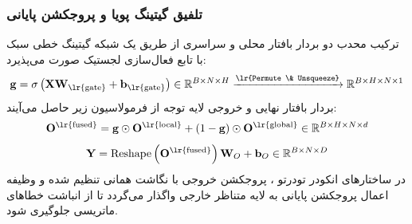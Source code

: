 \subsubsection*{تلفیق گیتینگ پویا و پروجکشن پایانی}
ترکیب محدب دو بردار بافتار محلی و سراسری از طریق یک شبکه گیتینگ خطی سبک با تابع فعال‌سازی لجستیک صورت می‌پذیرد:
\begin{equation}
\mathbf{g} = \sigma\left( \mathbf{X} \mathbf{W}_{\text{\lr{gate}}} + \mathbf{b}_{\text{\lr{gate}}} \right) \in \mathbb{R}^{B \times N \times H} \xrightarrow{\text{\lr{Permute \& Unsqueeze}}} \mathbb{R}^{B \times H \times N \times 1}
\end{equation}
بردار بافتار نهایی و خروجی لایه توجه از فرمولاسیون زیر حاصل می‌آیند:
\begin{equation}
\mathbf{O}^{\text{\lr{fused}}} = \mathbf{g} \odot \mathbf{O}^{\text{\lr{local}}} + (1 - \mathbf{g}) \odot \mathbf{O}^{\text{\lr{global}}} \in \mathbb{R}^{B \times H \times N \times d}
\end{equation}
\begin{equation}
\mathbf{Y} = \operatorname{Reshape}\left( \mathbf{O}^{\text{\lr{fused}}} \right) \mathbf{W}_O + \mathbf{b}_O \in \mathbb{R}^{B \times N \times D}
\end{equation}
در ساختارهای انکودر تودرتو ، پروجکشن خروجی با نگاشت همانی تنظیم شده و وظیفه اعمال پروجکشن پایانی به لایه متناظر خارجی  واگذار می‌گردد تا از انباشت خطاهای ماتریسی جلوگیری شود.


